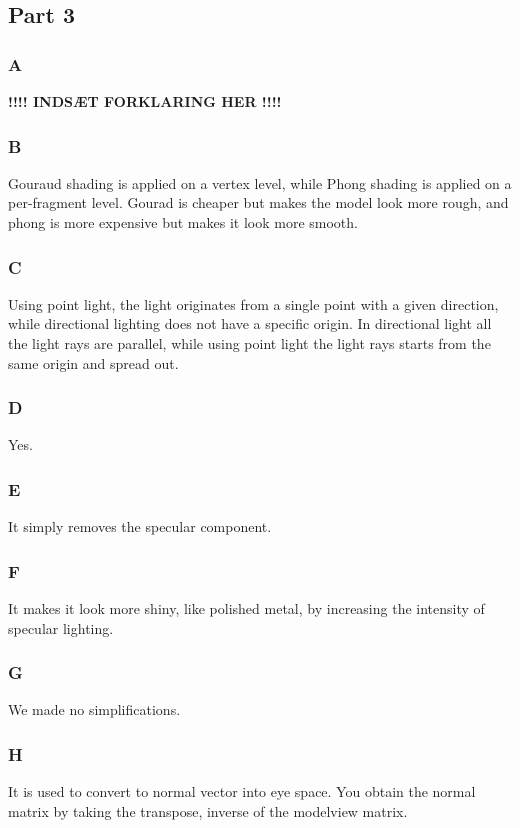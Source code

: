 \documentclass[11pt]{article}
\begin{document}
\subsection{Part 3}
\subsubsection{A}
\textbf{!!!! INDSÆT FORKLARING HER !!!!}


\subsubsection{B}
Gouraud shading is applied on a vertex level, while Phong shading is applied on a per-fragment level. Gourad is cheaper but makes the model look more rough, and phong is more expensive but makes it look more smooth.


\subsubsection{C}
Using point light, the light originates from a single point with a given direction, while directional lighting does not have a specific origin. In directional light all the light rays are parallel, while using point light the light rays starts from the same origin and spread out.


\subsubsection{D}
Yes.


\subsubsection{E}
It simply removes the specular component.


\subsubsection{F}
It makes it look more shiny, like polished metal, by increasing the intensity of specular lighting.


\subsubsection{G}
We made no simplifications.


\subsubsection{H}
It is used to convert to normal vector into eye space. You obtain the normal matrix by taking the transpose, inverse of the modelview matrix.
\end{document}
